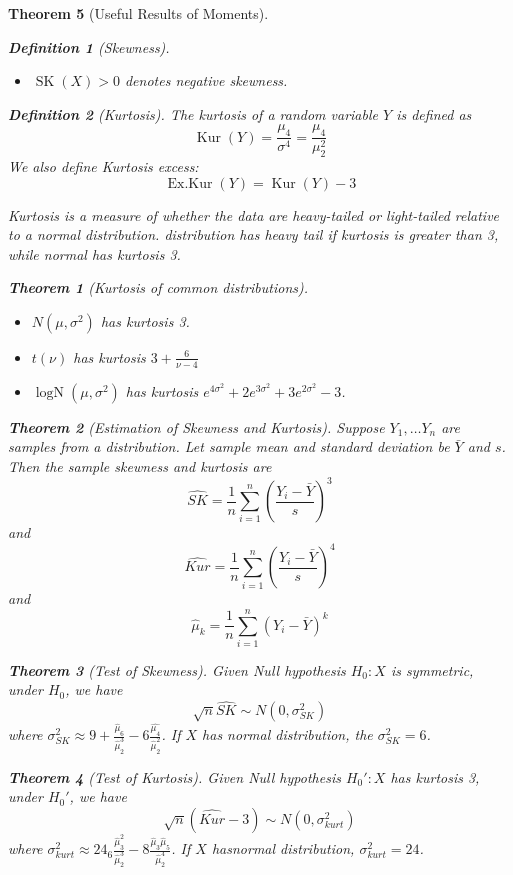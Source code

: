\documentclass[11pt]{article}
\newtheorem{definition}{Definition}[section]
\newtheorem{theorem}{Theorem}[section]
\theoremstyle{definition}
\DeclareMathOperator{\LogN}{logN}
\DeclareMathOperator{\SK}{SK}
\DeclareMathOperator{\Kur}{Kur}
\DeclareMathOperator{\ExKur}{Ex.Kur}
\begin{document}
\begin{theorem}[Useful Results of Moments]
\begin{definition}[Skewness]
\begin{itemize}
  \item $\SK(X)>0$ denotes negative skewness.
\end{itemize}
\end{definition}
\begin{definition}[Kurtosis]
\normalfont The kurtosis of a random variable $Y$ is defined as
\[
\Kur(Y) = \frac{\mu_4}{\sigma^4} =\frac{\mu_4}{\mu_2^2}
\]
We also define Kurtosis excess:
\[
\ExKur(Y) = \Kur(Y)-3
\]
\end{definition}
Kurtosis is a measure of whether the data are heavy-tailed or light-tailed relative to a normal distribution. distribution has heavy tail if kurtosis is greater than 3, while normal has kurtosis 3.
\begin{theorem}[Kurtosis of common distributions]
\normalfont
\begin{itemize}
  \item $N(\mu, \sigma^2)$ has kurtosis 3.
  \item $t(\nu)$ has kurtosis $3+\frac{6}{\nu -4}$
  \item $\LogN(\mu, \sigma^2)$ has kurtosis $e^{4\sigma^2}+2e^{3\sigma^2} + 3e^{2\sigma^2}-3$.
\end{itemize}
\end{theorem}
\begin{theorem}[Estimation of Skewness and Kurtosis]
\normalfont Suppose $Y_1, \ldots Y_n$ are samples from a distribution. Let sample mean and standard deviation be $\bar{Y}$ and $s$. Then the sample skewness and kurtosis are
\[
\hat{SK}=\frac{1}{n}\sum_{i=1}^n (\frac{Y_i-\bar{Y}}{s})^3
\]
and
\[
\hat{Kur}=\frac{1}{n}\sum_{i=1}^n(\frac{Y_i-\bar{Y}}{s})^4
\]
and
\[
\hat{\mu}_k= \frac{1}{n}\sum_{i=1}^n(Y_i-\bar{Y})^k
\]
\end{theorem}
\begin{theorem}[Test of Skewness]
\normalfont Given Null hypothesis $H_0: X$ is symmetric, under $H_0$, we have
\[
\sqrt{n}\hat{SK}\sim N(0,\sigma_{SK}^2)
\]
where $\sigma_{SK}^2\approx 9 + \frac{\hat{\mu}_6}{\hat{\mu}_2^3}-6\frac{\hat{\mu_4}}{\hat{\mu}_2^2}$.
If $X$ has normal distribution, the $\sigma_{SK}^2 = 6$.
\end{theorem}
\begin{theorem}[Test of Kurtosis]
\normalfont Given Null hypothesis $H_0': X$ has kurtosis 3, under $H_0'$, we have
\[
\sqrt{n}(\hat{Kur}-3)\sim N(0, \sigma_{kurt}^2)
\]
where $\sigma_{kurt}^2 \approx 24 _ 6\frac{\hat{\mu}_3^2}{\hat{\mu}_2^3} - 8\frac{\hat{\mu}_3\hat{\mu}_5}{\hat{\mu}_2^4}$.
If $X$ hasnormal distribution, $\sigma_{kurt}^2= 24$.
\end{theorem}

\end{theorem}
\end{document}

